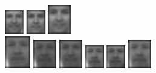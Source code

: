 \begin{figure}[hbt]
  \includegraphics[width=0.073\textwidth]{../results/L_rez/correct80/2/8.jpg}
  \includegraphics[width=0.073\textwidth]{../results/L_rez/correct80/2/9.jpg}
  \includegraphics[width=0.09\textwidth]{../results/L_rez/correct80/2/10.jpg} \\
  \vspace{4pt}
  \includegraphics[width=0.1\textwidth]{../results/L_rez/correct80/3/testImg.jpg} \vline
  \hspace{2pt}
  \includegraphics[width=0.09\textwidth]{../results/L_rez/correct80/3/1.jpg}
  \includegraphics[width=0.09\textwidth]{../results/L_rez/correct80/3/2.jpg}
  \includegraphics[width=0.073\textwidth]{../results/L_rez/correct80/3/3.jpg}
  \includegraphics[width=0.073\textwidth]{../results/L_rez/correct80/3/4.jpg}
  \includegraphics[width=0.09\textwidth]{../results/L_rez/correct80/3/5.jpg}

\end{figure}
